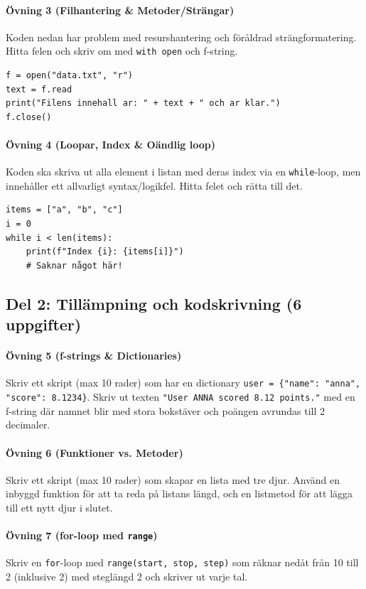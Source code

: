 \documentclass{article}
\begin{document}
\paragraph{Övning 3 (Filhantering \& Metoder/Strängar)}
Koden nedan har problem med resurshantering och föråldrad strängformatering. Hitta felen och skriv om med \texttt{with open} och f-string.
\begin{lstlisting}
f = open("data.txt", "r")
text = f.read
print("Filens innehall ar: " + text + " och ar klar.")
f.close()
\end{lstlisting}

\paragraph{Övning 4 (Loopar, Index \& Oändlig loop)}
Koden ska skriva ut alla element i listan med deras index via en \texttt{while}-loop, men innehåller ett allvarligt syntax/logikfel. Hitta felet och rätta till det.
\begin{lstlisting}
items = ["a", "b", "c"]
i = 0
while i < len(items):
    print(f"Index {i}: {items[i]}")
    # Saknar något här!
\end{lstlisting}

\bigskip
\subsection*{Del 2: Tillämpning och kodskrivning (6 uppgifter)}

\paragraph{Övning 5 (f-strings \& Dictionaries)}
Skriv ett skript (max 10 rader) som har en dictionary \texttt{user = \{"name": "anna", "score": 8.1234\}}. Skriv ut texten \texttt{"User ANNA scored 8.12 points."} med en f-string där namnet blir med stora bokstäver och poängen avrundas till 2 decimaler.

\paragraph{Övning 6 (Funktioner vs. Metoder)}
Skriv ett skript (max 10 rader) som skapar en lista med tre djur. Använd en inbyggd funktion för att ta reda på listans längd, och en listmetod för att lägga till ett nytt djur i slutet.

\paragraph{Övning 7 (for-loop med \texttt{range})}
Skriv en \texttt{for}-loop med \texttt{range(start, stop, step)} som räknar nedåt från 10 till 2 (inklusive 2) med steglängd 2 och skriver ut varje tal.
\end{document}
